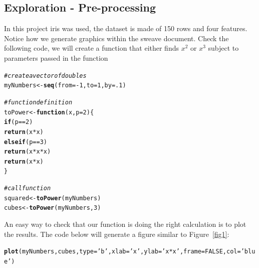 \documentclass[10pt]{article}\usepackage[]{graphicx}\usepackage[]{color}
\makeatletter
\newcommand{\hlnum}[1]{\textcolor[rgb]{0.686,0.059,0.569}{#1}}%
\newcommand{\hlstr}[1]{\textcolor[rgb]{0.192,0.494,0.8}{#1}}%
\newcommand{\hlcom}[1]{\textcolor[rgb]{0.678,0.584,0.686}{\textit{#1}}}%
\newcommand{\hlopt}[1]{\textcolor[rgb]{0,0,0}{#1}}%
\newcommand{\hlstd}[1]{\textcolor[rgb]{0.345,0.345,0.345}{#1}}%
\newcommand{\hlkwa}[1]{\textcolor[rgb]{0.161,0.373,0.58}{\textbf{#1}}}%
\newcommand{\hlkwb}[1]{\textcolor[rgb]{0.69,0.353,0.396}{#1}}%
\newcommand{\hlkwc}[1]{\textcolor[rgb]{0.333,0.667,0.333}{#1}}%
\newcommand{\hlkwd}[1]{\textcolor[rgb]{0.737,0.353,0.396}{\textbf{#1}}}%
\newenvironment{kframe}{%
 \def\at@end@of@kframe{}%
 \ifinner\ifhmode%
  \def\at@end@of@kframe{\end{minipage}}%
  \begin{minipage}{\columnwidth}%
 \fi\fi%
 \def\FrameCommand##1{\hskip\@totalleftmargin \hskip-\fboxsep
 \colorbox{shadecolor}{##1}\hskip-\fboxsep
     \hskip-\linewidth \hskip-\@totalleftmargin \hskip\columnwidth}%
 \MakeFramed {\advance\hsize-\width
   \@totalleftmargin\z@ \linewidth\hsize
   \@setminipage}}%
 {\par\unskip\endMakeFramed%
 \at@end@of@kframe}
\newenvironment{knitrout}{}{} %
\makeatother
\begin{document}
\subsection{Exploration - Pre-processing}\label{explore}


In this project iris was used, the dataset is made of 150 rows and four features. \\

Notice how we generate graphics within the sweave document. Check the following code, we will create a function that either finds $x^2$ or $x^3$ subject to parameters passed in the function
\begin{knitrout}
\color{fgcolor}\begin{kframe}
\begin{alltt}
\hlcom{# create a vector of doubles}
\hlstd{myNumbers} \hlkwb{<-} \hlkwd{seq}\hlstd{(}\hlkwc{from}\hlstd{=}\hlopt{-}\hlnum{1}\hlstd{,}\hlkwc{to}\hlstd{=}\hlnum{1}\hlstd{,}\hlkwc{by}\hlstd{=}\hlnum{.1}\hlstd{)}

\hlcom{# function definition}
\hlstd{toPower} \hlkwb{<-} \hlkwa{function} \hlstd{(}\hlkwc{x}\hlstd{,}\hlkwc{p}\hlstd{=}\hlnum{2}\hlstd{) \{}
    \hlkwa{if} \hlstd{(p}\hlopt{==}\hlnum{2}\hlstd{)}
        \hlkwd{return} \hlstd{(x}\hlopt{*}\hlstd{x)}
    \hlkwa{else if} \hlstd{(p}\hlopt{==}\hlnum{3}\hlstd{)}
        \hlkwd{return} \hlstd{(x}\hlopt{*}\hlstd{x}\hlopt{*}\hlstd{x)}
    \hlkwd{return} \hlstd{(x}\hlopt{*}\hlstd{x)}
\hlstd{\}}

\hlcom{# call function}
\hlstd{squared} \hlkwb{<-} \hlkwd{toPower}\hlstd{(myNumbers)}
\hlstd{cubes} \hlkwb{<-} \hlkwd{toPower}\hlstd{(myNumbers,}\hlnum{3}\hlstd{)}
\end{alltt}
\end{kframe}
\end{knitrout}

An easy way to check that our function is doing the right calculation is to plot the results. The code below will generate a figure similar to Figure~\ref{fig1}: 
\begin{knitrout}
\color{fgcolor}\begin{kframe}
\begin{alltt}
\hlkwd{plot}\hlstd{(myNumbers,cubes,}\hlkwc{type}\hlstd{=}\hlstr{'b'}\hlstd{,}\hlkwc{xlab} \hlstd{=} \hlstr{'x'}\hlstd{,} \hlkwc{ylab} \hlstd{=} \hlstr{'x*x'}\hlstd{,}\hlkwc{frame}\hlstd{=}\hlnum{FALSE}\hlstd{,}\hlkwc{col}\hlstd{=}\hlstr{'blue'}\hlstd{)}
\end{alltt}
\end{kframe}
\end{knitrout}
\end{document}
